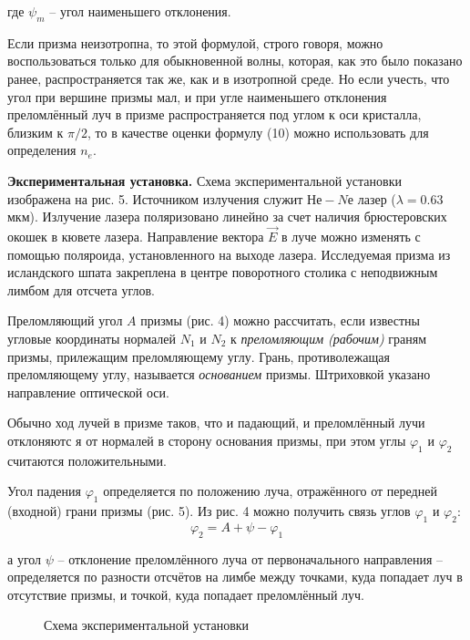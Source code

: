 \documentclass[14pt]{article}
\begin{document}
\noindent где $\psi_m$ -- угол наименьшего отклонения.

Если призма неизотропна, то этой формулой, строго говоря, можно
воспользоваться только для обыкновенной волны,
которая, как это было показано ранее, распространяется так же, как
и в изотропной среде. Но если учесть, что угол при вершине призмы мал,
и при угле наименьшего отклонения преломлённый луч в призме распространяется под углом к
оси кристалла, близким к $\pi/2$, то в качестве оценки формулу (10) можно использовать для определения
$n_e$.


\textbf{Экспериментальная установка.} Схема экспериментальной установки
изображена на рис. 5. Источником излучения служит $Не-Nе$ лазер ($\lambda = 0.63$ мкм). Излучение лазера поляризовано линейно за счет наличия
брюстеровских окошек в кювете лазера. Направление вектора $\vec{E}$ в луче можно изменять с помощью поляроида, установленного на выходе
лазера. Исследуемая призма из исландского шпата закреплена в центре поворотного столика с неподвижным лимбом для отсчета углов.

Преломляющий угол $A$ призмы (рис. 4) можно рассчитать, если известны
угловые координаты нормалей
$N_1$ и $N_2$ к \textsl{преломляющим (рабочим)} граням призмы, прилежащим преломляющему углу. Грань, противолежащая
преломляющему углу, называется \textsl{основанием} призмы. Штриховкой указано направление оптической оси.

Обычно ход лучей в призме таков, что и падающий,
и преломлённый лучи отклоняютс я от нормалей в сторону основания призмы, при этом углы
$\varphi_1$ и $\varphi_2$ считаются положительными.

Угол падения $\varphi_1$ определяется по положению луча, отражённого от передней (входной) грани призмы (рис. 5). Из рис. 4 можно получить
связь углов $\varphi_1$ и $\varphi_2$:
\begin{equation}
	\varphi_2 = A + \psi - \varphi_1
\end{equation}

\noindent а угол $\psi$ -- отклонение преломлённого луча от первоначального направления -- определяется по разности отсчётов на лимбе между точками,
куда попадает луч в отсутствие призмы, и точкой, куда попадает преломлённый
луч.

\begin{figure}[h!]
	\caption{Схема экспериментальной установки}
	\label{fig:image}
\end{figure}
\end{document}
